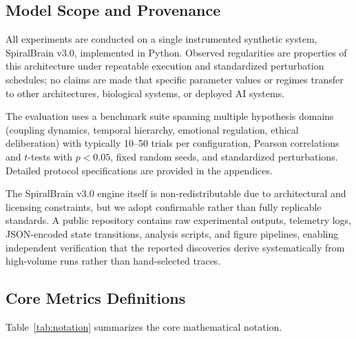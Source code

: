 \documentclass[11pt,a4paper]{article}
\begin{document}
\subsection{Model Scope and Provenance}

All experiments are conducted on a single instrumented synthetic system, SpiralBrain v3.0, implemented in Python. Observed regularities are properties of this architecture under repeatable execution and standardized perturbation schedules; no claims are made that specific parameter values or regimes transfer to other architectures, biological systems, or deployed AI systems.

The evaluation uses a benchmark suite spanning multiple hypothesis domains (coupling dynamics, temporal hierarchy, emotional regulation, ethical deliberation) with typically 10--50 trials per configuration, Pearson correlations and \( t \)-tests with \( p < 0.05 \), fixed random seeds, and standardized perturbations. Detailed protocol specifications are provided in the appendices.

The SpiralBrain v3.0 engine itself is non-redistributable due to architectural and licensing constraints, but we adopt confirmable rather than fully replicable standards. A public repository contains raw experimental outputs, telemetry logs, JSON-encoded state transitions, analysis scripts, and figure pipelines, enabling independent verification that the reported discoveries derive systematically from high-volume runs rather than hand-selected traces.

\subsection{Core Metrics Definitions}

Table~\ref{tab:notation} summarizes the core mathematical notation.
\end{document}
